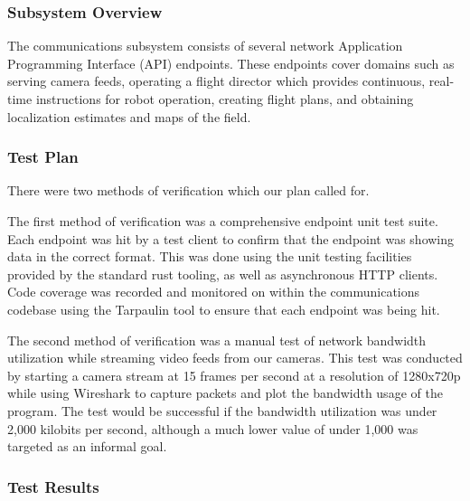 \subsubsection{Subsystem Overview}
The communications subsystem consists of several network Application Programming Interface (API)
endpoints.
These endpoints cover domains such as serving camera feeds, operating a flight director which
provides continuous, real-time instructions for robot operation, creating flight plans,
and obtaining localization estimates and maps of the field.

\subsubsection{Test Plan}
There were two methods of verification which our plan called for.

The first method of verification was a comprehensive endpoint unit test suite.
Each endpoint was hit by a test client to confirm that the endpoint was showing data in the correct
format.
This was done using the unit testing facilities provided by the standard rust tooling, as well as
asynchronous HTTP clients.
Code coverage was recorded and monitored on within the communications codebase using the
Tarpaulin\cite{tarpaulin} tool to ensure that each endpoint was being hit.

The second method of verification was a manual test of network bandwidth utilization while
streaming video feeds from our cameras.
This test was conducted by starting a camera stream at 15 frames per second at a resolution of
1280x720p while using Wireshark\cite{wireshark} to capture packets and plot the bandwidth usage of
the program.
The test would be successful if the bandwidth utilization was under 2,000 kilobits per second,
although a much lower value of under 1,000 was targeted as an informal goal.

\subsubsection{Test Results}
